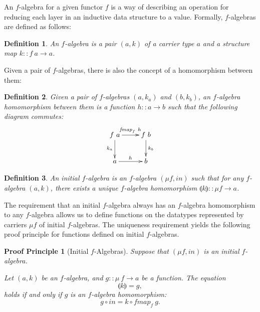 \documentclass{jfp1}
\newcommand{\fold}[1]{\llparenthesis #1 \rrparenthesis}
\newtheorem{definition}{Definition}
\newtheorem{proofprinciple}{Proof Principle}
\begin{document}
An $f$-algebra for a given functor $f$ is a way of describing an
operation for reducing each layer in an inductive data structure to a
value. Formally, $f$-algebras are defined as follows:
\begin{definition}
  An \emph{$f$-algebra} is a pair $(a, k)$ of a
  \emph{carrier type} $a$ and a \emph{structure map}
  $k :: f~a \to a$.
\end{definition}
Given a pair of $f$-algebras, there is also the concept of a
homomorphism between them:
\begin{definition}
  Given a pair of $f$-algebras $(a,k_a)$ and $(b, k_b)$, an
  \emph{$f$-algebra homomorphism} between them is a function $h :: a
  \to b$ such that the following diagram commutes:
  \begin{equation}
    \label{eq:falgebra-homomorphism}
    \xymatrix{
      {f~a} \ar[r]^{\mathit{fmap}_f~h} \ar[d]_{k_a}
      &
      {f~b} \ar[d]^{k_b}
      \\
      {a} \ar[r]^h
      &
      {b}
    }
  \end{equation}


\end{definition}

\begin{definition}
  An \emph{initial $f$-algebra} is an $f$-algebra $(\mu \! f,
  \mathit{in})$ such that for any $f$-algebra $(a, k)$, there exists
  a unique $f$-algebra homomorphism $\fold{k} :: \mu f \to a$.
\end{definition}

The requirement that an initial $f$-algebra always has an $f$-algebra
homomorphism to any $f$-algebra allows us to define functions on the
datatypes represented by carriers $\mu \! f$ of initial
$f$-algebras. The uniqueness requirement yields the following proof
principle for functions defined on initial $f$-algebras.

\begin{proofprinciple}[Initial $f$-Algebras]\label{pp:initial-alg}
  Suppose that $(\mu f, \mathit{in})$ is an initial $f$-algebra.

  Let $(a, k)$ be an $f$-algebra, and $g :: \mu~f \to
  a$ be a function. The equation
  \begin{displaymath}
    \fold{k} = g,
  \end{displaymath}
  holds if and only if $g$ is an $f$-algebra homomorphism:
  \begin{displaymath}
    g \circ \mathit{in} = k \circ \mathit{fmap}_f~g.
  \end{displaymath}
\end{proofprinciple}
\end{document}
